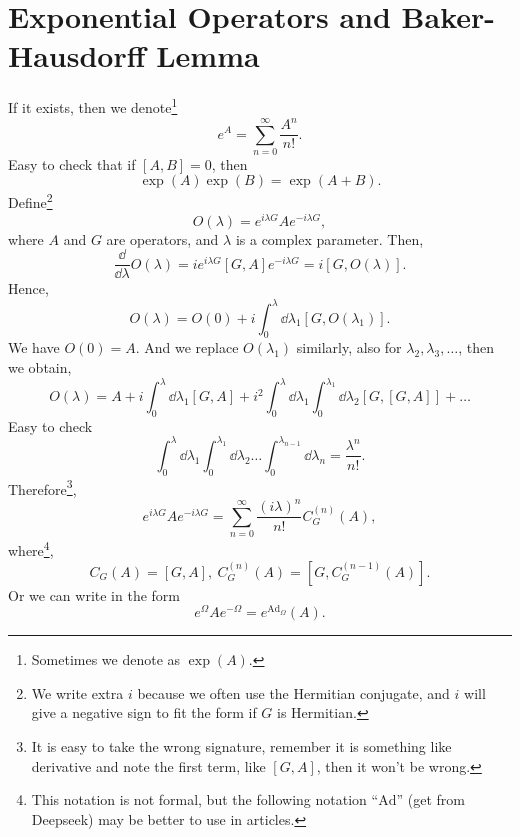 \documentclass{article}
\theoremstyle{1}
\begin{document}
\section{Exponential Operators and Baker-Hausdorff Lemma }
If it exists, then we denote\footnote{Sometimes we denote as $\exp(A)$.}
\begin{equation}
    e^A=\sum_{n=0}^{\infty}\frac{A^n}{n!}.
\end{equation}
Easy to check that if $[A,B]=0$, then 
\begin{equation}
    \exp(A)\exp(B)=\exp(A+B).
\end{equation}
Define\footnote{We write extra $i$ because we often use the Hermitian conjugate, and $i$ will give a negative sign to fit the form if $G$ is Hermitian.}
\begin{equation}
    O(\lambda)=e^{i\lambda G}Ae^{-i\lambda G},
\end{equation}
where $A$ and $G$ are operators, and $\lambda$ is a complex parameter. Then,
\begin{equation}
    \frac{\dd}{\dd{\lambda}}O(\lambda)=ie^{i\lambda G}[G,A]e^{-i\lambda G}=i[G,O(\lambda)].
\end{equation}
Hence, 
\begin{equation}
    O(\lambda)=O(0)+i\int_{0}^{\lambda}\dd{\lambda_1}[G,O(\lambda_1)].
\end{equation}
We have $O(0)=A$. And we replace $O(\lambda_1)$ similarly, also for $\lambda_2,\lambda_3,\dots$, then we obtain,
\begin{equation}
    O(\lambda)=A+i\int_{0}^{\lambda}\dd{\lambda_1}[G,A]+i^2\int_{0}^{\lambda}\dd{\lambda_1}\int_{0}^{\lambda_1}\dd{\lambda_2}[G,[G,A]]+\dots
\end{equation}
Easy to check 
\begin{equation}
    \int_{0}^{\lambda}\dd{\lambda_1}\int_{0}^{\lambda_1}\dd{\lambda_2}\dots\int_{0}^{\lambda_{n-1}}\dd{\lambda_n}=\frac{\lambda^n}{n!}.
\end{equation}
Therefore\footnote{ It is easy to take the wrong signature, remember it is something like derivative and note the first term, like $[G,A]$, then it won't be wrong.},
\begin{equation}
    \boxed{e^{i\lambda G}Ae^{-i\lambda G}=\sum_{n=0}^{\infty}\frac{\left(i\lambda\right)^n}{n!}C_G^{(n)}(A)},
\end{equation}
where\footnote{This notation is not formal, but the following notation ``$\mathrm{Ad}$'' (get from Deepseek)  may be better to use in articles.}, 
\begin{equation}
    C_G(A)=[G,A],\ C_G^{(n)}(A)=[G,C_G^{(n-1)}(A)].
\end{equation}
Or we can write in the form 
\begin{equation}
    e^\Omega A e^{-\Omega }=e^{\mathrm{Ad}_\Omega}(A).
\end{equation}
\end{document}
